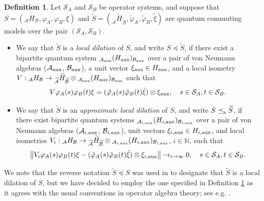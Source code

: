 \documentclass[11pt]{amsart}
\theoremstyle{definition}
\newtheorem{defn}[theorem]{Definition}
\newcommand{\cl}[1]{\mathcal{#1}}
\newcommand{\bb}[1]{\mathbb{#1}}
\providecommand{\wt}[1]{\widetilde{#1}}
\begin{document}
\begin{defn}\label{d_appdil}
Let $\cl S_A$ and $\cl S_B$ be operator systems, and 
suppose that 
$S = (_{\cl A}H_{\cl B}, \varphi_A, \varphi_B, \xi)$  and 
$\wt{S} = (_{\wt{\cl A}}\wt{H}_{\wt{\cl B}}, \wt{\varphi}_A, \wt{\varphi}_B, \wt{\xi})$ are quantum commuting models over the pair $(\cl S_A,\cl S_B)$.

\begin{itemize}
\item[(i)] We say that $\wt{S}$
is a \emph{local dilation} of $S$, and write $S\preceq \wt{S}$, 
if there exist a bipartite quantum system 
$_{{\cl A}_{\rm aux}}(H_{\rm aux})_{{\cl B}_{\rm aux}}$ 
over a pair of von Neumann algebras (${\cl A}_{\rm aux}$, ${\cl B}_{\rm aux}$), a unit vector $\xi_{\rm aux}\in H_{\rm aux}$, and
a local isometry $V : \mbox{}_{\cl A}H_{\cl B}\to
\mbox{}_{\wt{\cl A}}\wt{H}_{\wt{\cl B}}\otimes
\mbox{}_{{\cl A}_{\rm aux}}(H_{\rm aux})_{{\cl B}_{\rm aux}}$ such that 
\begin{equation}\label{eq_TAB}
V\varphi_A(s) \varphi_B(t)\xi = (\tilde\varphi_A(s)\tilde\varphi_B(t)\tilde\xi) \otimes\xi_{\rm aux}, \ \ \ s\in \cl S_A, t\in\cl S_B.
\end{equation}

\item[(ii)] 
We say that $\wt{S}$
is an \emph{approximate local dilation} of $S$, and write $S\preceq_{\rm a} \wt{S}$, 
if there exist bipartite quantum systems
$_{{\cl A}_{i,\rm aux}}(H_{i,\rm aux})_{{\cl B}_{i,\rm aux}}$ 
over a pair of von Neumann algebras (${\cl A}_{i,\rm aux}$, ${\cl B}_{i,\rm aux}$), 
unit vectors $\xi_{i,\rm aux}\in H_{i,\rm aux}$, and
local isometries $V_i : \mbox{}_{\cl A}H_{\cl B}\to
\mbox{}_{\wt{\cl A}}\wt{H}_{\wt{\cl B}}\otimes
\mbox{}_{{\cl A}_{i,\rm aux}}(H_{i,\rm aux})_{{\cl B}_{i,\rm aux}}$, 
$i\in \bb{N}$, such that 
\begin{equation}\label{eq_TABa}
\left\|V_i\varphi_A(s) \varphi_B(t)\xi - (\tilde\varphi_A(s)\tilde\varphi_B(t)\tilde\xi) \otimes\xi_{i,\rm aux}\right\|\to_{i\to \infty} 0, \ \ \ s\in \cl S_A, t\in\cl S_B.
\end{equation}
\end{itemize}
\end{defn}


We note that the reverse notation $\wt{S}\preceq S$ was used in 
\cite{pszz} to designate that $\wt{S}$
is a local dilation of $S$, but we have decided to employ the 
one specified in Definition \ref{d_appdil} as it agrees 
with the usual conventions in operator algebra theory; see e.g. 
\cite{davk}. 
\end{document}
